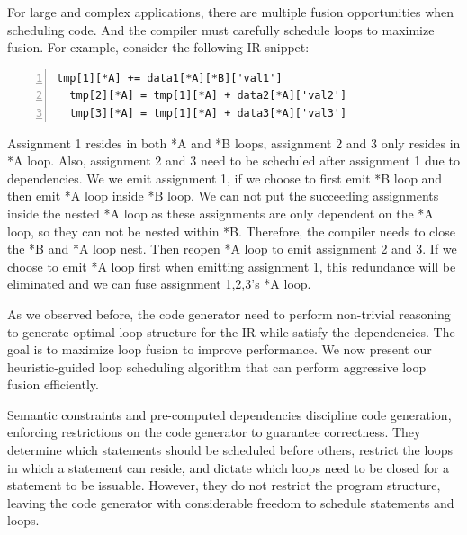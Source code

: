 \documentclass[sigplan, nonacm]{acmart}\settopmatter{printfolios=true,printccs=false,printacmref=false}
\begin{document}
For large and complex applications, there are multiple fusion opportunities when scheduling code. And the compiler must carefully schedule loops to maximize fusion. For example, consider the following IR snippet:
\begin{lstlisting}[numbers=left]
  tmp[1][*A] += data1[*A][*B]['val1']
  tmp[2][*A] = tmp[1][*A] + data2[*A]['val2']
  tmp[3][*A] = tmp[1][*A] + data3[*A]['val3']
  \end{lstlisting}
Assignment 1 resides in both *A and *B loops, assignment 2 and 3 only resides in *A loop. Also, assignment 2 and 3 need to be scheduled after assignment 1 due to dependencies. We we emit assignment 1, if we choose to first emit *B loop and then emit *A loop inside *B loop. We can not put the succeeding assignments inside the nested *A loop as these assignments are only dependent on the *A loop, so they can not be nested within *B. Therefore, the compiler needs to close the *B and *A loop nest. Then reopen *A loop to emit assignment 2 and 3. If we choose to emit *A loop first when emitting assignment 1, this redundance will be eliminated and we can fuse assignment 1,2,3's *A loop.\par
As we observed before, the code generator need to perform non-trivial reasoning to generate optimal loop structure for the IR while satisfy the dependencies. The goal is to maximize loop fusion to improve performance. We now present our heuristic-guided loop scheduling algorithm that can perform aggressive loop fusion efficiently.\par
\fi
Semantic constraints and pre-computed dependencies discipline code generation, enforcing restrictions on the code generator to guarantee correctness. They determine which statements should be scheduled before others, restrict the loops in which a statement can reside, and dictate which loops need to be closed for a statement to be issuable. However, they do not restrict the program structure, leaving the code generator with considerable freedom to schedule statements and loops.
\end{document}
